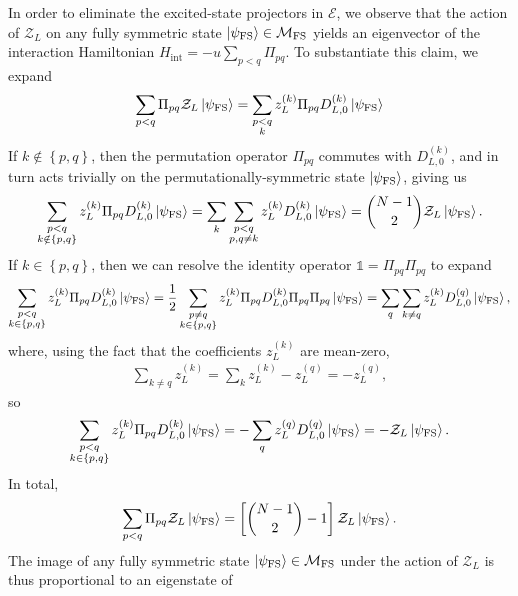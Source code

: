 \documentclass[nofootinbib,notitlepage,11pt]{revtex4-2}
\renewcommand{\t}{\text} %
\newcommand{\f}[2]{\dfrac{#1}{#2}} %
\newcommand{\p}[1]{\left(#1\right)} %
\renewcommand{\sp}[1]{\left[#1\right]} %
\renewcommand{\set}[1]{\left\{#1\right\}} %
\newcommand{\1}{\mathds{1}}
\newcommand{\E}{\mathcal{E}}
\newcommand{\M}{\mathcal{M}}
\newcommand{\Z}{\mathcal{Z}}
\newcommand{\FS}{\text{FS}}
\begin{document}
In order to eliminate the excited-state projectors in $\E$, we observe
that the action of $\Z_L$ on any fully symmetric state
$\ket{\psi_{\FS}}\in\M_\FS$ yields an eigenvector of the interaction
Hamiltonian $H_{\t{int}}=-u\sum_{p<q}\Pi_{pq}$.  To substantiate this
claim, we expand
\begin{align}
  \sum_{p<q} \Pi_{pq} \Z_L \ket{\psi_\FS}
  = \sum_{\substack{p<q\\k}}
  z_L^{(k)} \Pi_{pq} D_{L,0}^{(k)} \ket{\psi_\FS}
\end{align}
If $k\notin\set{p,q}$, then the permutation operator $\Pi_{pq}$
commutes with $D_{L,0}^{(k)}$, and in turn acts trivially on the
permutationally-symmetric state $\ket{\psi_\FS}$, giving us
\begin{align}
  \sum_{\substack{p<q\\k\notin\set{p,q}}}
  z_L^{(k)} \Pi_{pq} D_{L,0}^{(k)} \ket{\psi_\FS}
  = \sum_k \sum_{\substack{p<q\\p,q\ne k}}
  z_L^{(k)} D_{L,0}^{(k)} \ket{\psi_\FS}
  = { N-1 \choose 2 } \Z_L \ket{\psi_\FS}.
  \label{eq:Z_eig_notin}
\end{align}
If $k\in\set{p,q}$, then we can resolve the identity operator
$\1=\Pi_{pq}\Pi_{pq}$ to expand
\begin{multline}
  \sum_{\substack{p<q\\k\in\set{p,q}}}
  z_L^{(k)} \Pi_{pq} D_{L,0}^{(k)} \ket{\psi_\FS}
  = \f12 \sum_{\substack{p\ne q\\k\in\set{p,q}}}
  z_L^{(k)} \Pi_{pq} D_{L,0}^{(k)} \Pi_{pq} \Pi_{pq} \ket{\psi_\FS}
  = \sum_q \sum_{k\ne q} z_L^{(k)} D_{L,0}^{(q)} \ket{\psi_\FS},
\end{multline}
where, using the fact that the coefficients $z_L^{(k)}$ are mean-zero,
\begin{align}
  \sum_{k\ne q} z_L^{(k)}
  = \sum_k z_L^{(k)} - z_L^{(q)}
  = - z_L^{(q)},
\end{align}
so
\begin{align}
  \sum_{\substack{p<q\\k\in\set{p,q}}}
  z_L^{(k)} \Pi_{pq} D_{L,0}^{(k)} \ket{\psi_\FS}
  = - \sum_q z_L^{(q)} D_{L,0}^{(q)} \ket{\psi_\FS}
  = - \Z_L \ket{\psi_\FS}.
\end{align}
In total,
\begin{align}
  \sum_{p<q} \Pi_{pq} \Z_L \ket{\psi_\FS}
  = \sp{{N-1\choose 2}-1} \Z_L \ket{\psi_\FS}.
\end{align}
The image of any fully symmetric state $\ket{\psi_\FS}\in\M_\FS$ under
the action of $\Z_L$ is thus proportional to an eigenstate of
\end{document}

